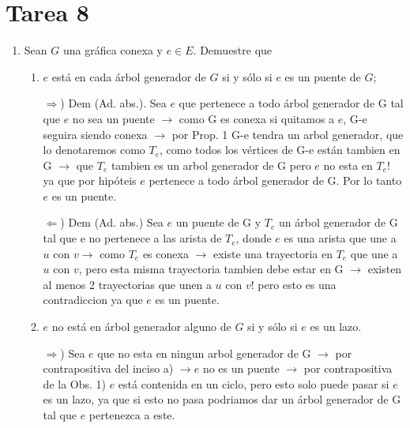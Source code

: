 \documentclass{article}
\begin{document}
\section*{\LARGE{Tarea 8}}
\begin{enumerate}
\item Sean $G$ una gr\'afica conexa y $e \in E$.   Demuestre que
  \begin{enumerate}

    Proposiciones a usar 

    Prop. 1) Corolario 2.2.3 Si G es una gráfica conexa, entonces G contiene un árbol  generador (Demostración en la notas pagina 32).

    Obs. 1) Por definicion podemos concluir que una arista es un puente sii no esta contenida en ningun ciclo.


  \item $e$ est\'a en cada \'arbol generador de $G$ si y s\'olo si $e$ es un puente
    de $G$;

    $\Longrightarrow$) Dem (Ad. abs.). Sea $e$ que pertenece a todo árbol generador de G tal que $e$ no sea un puente $\rightarrow$ como G es conexa si quitamos a $e$, G-e seguira siendo conexa $\rightarrow$ por Prop. 1 G-e tendra un arbol generador, que lo denotaremos como $T_e$, como todos los vértices de G-e están tambien en G $\rightarrow$ que $T_e$ tambien  es un arbol generador de G pero $e$ no esta en $T_e$! ya que por hipóteis $e$ pertenece a todo árbol generador de G. Por lo tanto $e$ es un puente.


    $\Longleftarrow$) Dem (Ad. abs.) Sea $e$ un puente de G y $T_e$ un árbol generador de G tal que e no pertenece a las arista de $T_e$, donde $e$ es una arista que une a $u$ con  $v \rightarrow$ como $T_e$ es conexa $\rightarrow$ existe una trayectoria en $T_e$ que une a $u$ con  $v$, pero esta misma trayectoria tambien debe estar en G $\rightarrow$ existen al menos 2 trayectorias que unen a $u$ con  $v$! pero esto es una contradiccion ya que $e$ es un puente.


  \item $e$ no est\'a en \'arbol generador alguno de $G$ si y s\'olo si $e$ es un lazo.
  
  $\Longrightarrow$) Sea $e$ que no esta en ningun arbol generador de G $ \rightarrow$ por contrapositiva del inciso a) $ \rightarrow e$ no es un puente $ \rightarrow$ por contrapositiva de la Obs. 1) $e$ está contenida en un ciclo, pero esto solo puede pasar si $e$ es un lazo, ya que si esto no pasa podriamos dar un árbol generador de G tal que $e$ pertenezca a este. 


\end{enumerate}
\end{enumerate}
\end{document}
